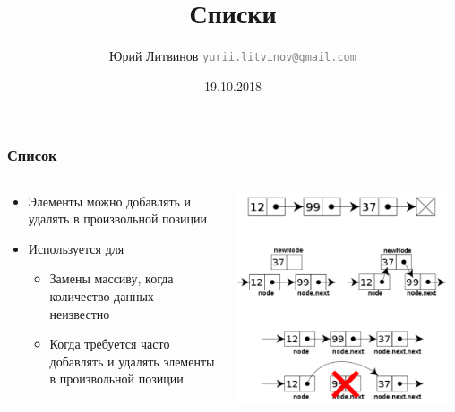 \documentclass[xetex,mathserif,serif]{beamer}
\title{Списки}
\author[Юрий Литвинов]{Юрий Литвинов \newline \textcolor{gray}{\small\texttt{yurii.litvinov@gmail.com}}}
\date{19.10.2018}
\begin{document}
	
	\frame{\titlepage}
	
	\begin{frame}
		\frametitle{Список}
		\begin{columns}
			\begin{column}{0.55\textwidth}
				\begin{itemize}
					\item Элементы можно добавлять и удалять в произвольной позиции
					\item Используется для
					\begin{itemize}
						\item Замены массиву, когда количество данных неизвестно
						\item Когда требуется часто добавлять и удалять элементы в произвольной позиции
					\end{itemize}
				\end{itemize}
			\end{column}
			\begin{column}{0.45\textwidth}
				\begin{center}
					\includegraphics[width=0.95\textwidth]{list.png}
				\end{center}
			\end{column}
		\end{columns}
	\end{frame}
\end{document}
